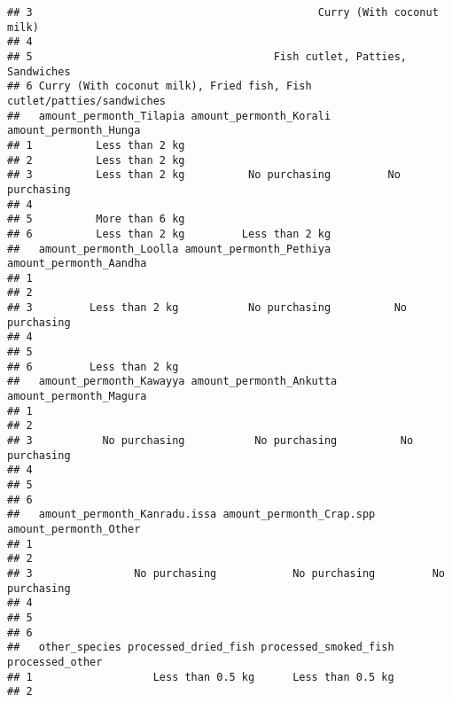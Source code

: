 \documentclass[
]{article}
\begin{document}
\begin{verbatim}
## 3                                             Curry (With coconut milk)
## 4                                                                      
## 5                                      Fish cutlet, Patties, Sandwiches
## 6 Curry (With coconut milk), Fried fish, Fish cutlet/patties/sandwiches
##   amount_permonth_Tilapia amount_permonth_Korali amount_permonth_Hunga
## 1          Less than 2 kg                                             
## 2          Less than 2 kg                                             
## 3          Less than 2 kg          No purchasing         No purchasing
## 4                                                                     
## 5          More than 6 kg                                             
## 6          Less than 2 kg         Less than 2 kg                      
##   amount_permonth_Loolla amount_permonth_Pethiya amount_permonth_Aandha
## 1                                                                      
## 2                                                                      
## 3         Less than 2 kg           No purchasing          No purchasing
## 4                                                                      
## 5                                                                      
## 6         Less than 2 kg                                               
##   amount_permonth_Kawayya amount_permonth_Ankutta amount_permonth_Magura
## 1                                                                       
## 2                                                                       
## 3           No purchasing           No purchasing          No purchasing
## 4                                                                       
## 5                                                                       
## 6                                                                       
##   amount_permonth_Kanradu.issa amount_permonth_Crap.spp amount_permonth_Other
## 1                                                                            
## 2                                                                            
## 3                No purchasing            No purchasing         No purchasing
## 4                                                                            
## 5                                                                            
## 6                                                                            
##   other_species processed_dried_fish processed_smoked_fish processed_other
## 1                   Less than 0.5 kg      Less than 0.5 kg                
## 2                                                                         

\end{verbatim}
\end{document}
